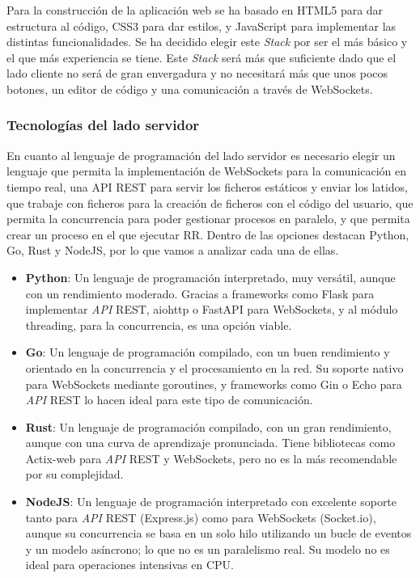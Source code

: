 Para la construcción de la aplicación web se ha basado en HTML5 para dar estructura al código, CSS3 para dar estilos, y JavaScript para implementar las distintas funcionalidades. Se ha decidido elegir este \textit{Stack} por ser el más básico y el que más experiencia se tiene. Este \textit{Stack} será más que suficiente dado que el lado cliente no será de gran envergadura y no necesitará más que unos pocos botones, un editor de código y una comunicación a través de WebSockets.


\subsubsection{Tecnologías del lado servidor} \label{sec:tecnologias-servidor}

En cuanto al lenguaje de programación del lado servidor es necesario elegir un lenguaje que permita la implementación de WebSockets para la comunicación en tiempo real, una API REST para servir los ficheros estáticos y enviar los latidos, que trabaje con ficheros para la creación de ficheros con el código del usuario, que permita la concurrencia para poder gestionar \glspl{proceso} en paralelo, y que permita crear un \gls{proceso} en el que ejecutar RR.
Dentro de las opciones destacan Python, Go, Rust y NodeJS, por lo que vamos a analizar cada una de ellas.

\begin{itemize}
    \item \textbf{Python}: Un lenguaje de programación interpretado, muy versátil, aunque con un rendimiento moderado. Gracias a frameworks como Flask para implementar \textit{API} REST, aiohttp o FastAPI para WebSockets, y al módulo threading, para la concurrencia, es una opción viable.
    \item \textbf{Go}: Un lenguaje de programación compilado, con un buen rendimiento y orientado en la concurrencia y el procesamiento en la red. Su soporte nativo para WebSockets mediante goroutines, y frameworks como Gin o Echo para \textit{API} REST lo hacen ideal para este tipo de comunicación.
    \item \textbf{Rust}: Un lenguaje de programación compilado, con un gran rendimiento, aunque con una curva de aprendizaje pronunciada. Tiene bibliotecas como Actix-web para \textit{API} REST y WebSockets, pero no es la más recomendable por su complejidad.
    \item \textbf{NodeJS}: Un lenguaje de programación interpretado con excelente soporte tanto para \textit{API} REST (Express.js) como para WebSockets (Socket.io), aunque su concurrencia se basa en un solo hilo utilizando un bucle de eventos y un modelo asíncrono; lo que no es un paralelismo real. Su modelo no es ideal para operaciones intensivas en CPU.
\end{itemize}

